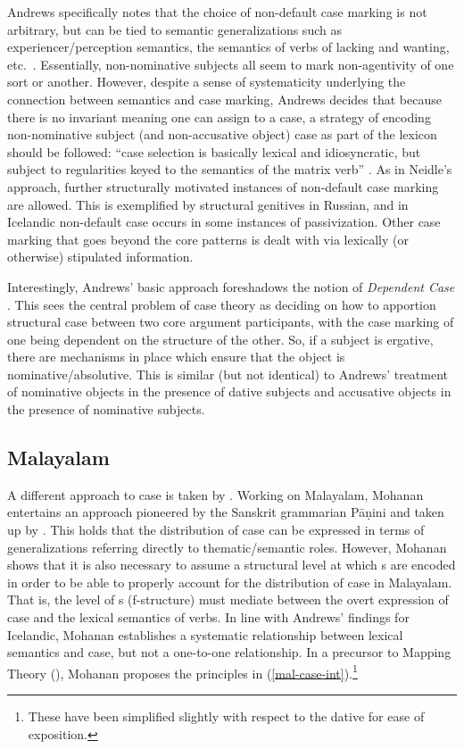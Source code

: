 \documentclass[output=paper,hidelinks]{langscibook}
\begin{document}

Andrews specifically notes that the choice of non-default case marking is not
arbitrary, but can be tied to semantic generalizations such as
experiencer/perception semantics, the semantics of verbs of lacking and wanting,
etc.~\citep[463]{Andrews82}.  Essentially, non-nominative subjects all seem to
mark non-agentivity of one sort or another. However, despite a sense of
systematicity underlying the connection between semantics and case marking,
Andrews decides that because there is no invariant meaning one can assign to a
case, a strategy of encoding non-nominative subject (and
non-accusative object) case as part of the lexicon should be followed: ``case selection is
basically lexical and idiosyncratic, but subject to regularities keyed to the
semantics of the matrix verb''  \citep[464]{Andrews82}.  As in Neidle's
approach, further structurally motivated instances of non-default case marking
are allowed.  This is exemplified by structural genitives in Russian, and in
Icelandic non-default case occurs in some instances of passivization.  Other case
marking that goes beyond the core patterns is dealt with via lexically (or
otherwise) stipulated information.

Interestingly, Andrews' basic approach foreshadows  the notion of {\em Dependent Case}
\citep{Marantz1991,baker15}. This sees the central problem of case theory as
deciding on how to apportion structural case between two core argument
participants, with the case marking of one being dependent on the structure of
the other. So, if a subject is ergative, there are mechanisms in place which
ensure that the object is nominative/absolutive. This is similar (but not identical) to
Andrews' treatment of nominative objects in the presence of dative subjects and
accusative objects in the presence of nominative subjects. 

\subsection{Malayalam}

A different approach to case is taken by \citet{mohanan1982}.  Working on
Malayalam, Mohanan  entertains an approach pioneered by the Sanskrit grammarian
P\={a}\d{n}ini \citep{boehtlingk39} and taken up by \citet{ostler79}. This holds
that the distribution of case can be expressed in terms of generalizations
referring directly to thematic/semantic roles. However, Mohanan shows that it is
also 
necessary to assume a structural level at which {\GF}s are encoded in order to be
able to properly account for the distribution of case in Malayalam. That is, the
level of {\GF}s (f-structure) must mediate between the overt expression of case and
the lexical semantics of verbs. In line with Andrews' findings for Icelandic,
Mohanan establishes a systematic relationship between lexical semantics and
case, but not a  one-to-one relationship. In a precursor to Mapping Theory (), Mohanan proposes the principles 
in (\ref{mal-case-int}).\footnote{These have been simplified  slightly with respect to
  the dative for ease of exposition.} 
\end{document}
